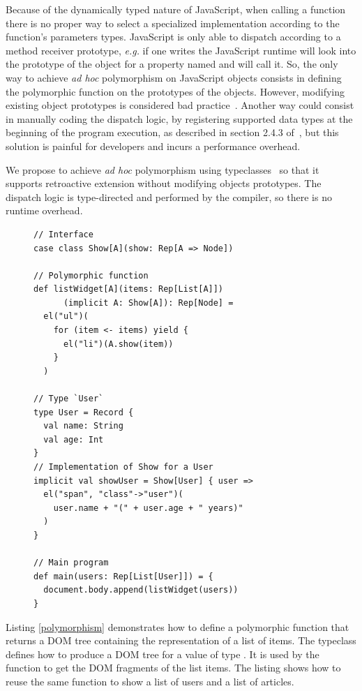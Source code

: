 \documentclass[preprint]{sigplanconf}
\newcommand{\eg}{\emph{e.g.}}
\begin{document}
Because of the dynamically typed nature of JavaScript, when calling a function there is no proper way to select a
specialized implementation according to the function’s parameters types. JavaScript is only able to dispatch
according to a method receiver prototype, \eg{} if one writes  the JavaScript runtime will look into
the prototype of the  object for a property named  and will call it. So, the only way to achieve
\emph{ad hoc} polymorphism on JavaScript objects consists in defining the polymorphic function on the prototypes of
the objects. However, modifying existing object prototypes is considered bad
practice~\cite{Zakas12_MaintainableJs}. Another way could consist in manually coding the dispatch logic, by
registering supported data types at the beginning of the program execution, as described in section 2.4.3
of~\cite{Abelson83_SICP}, but this solution is painful for developers and incurs a performance overhead.

We propose to achieve \emph{ad hoc} polymorphism using
typeclasses~\cite{Wadler89_AdhocPolymorphism,Odersky06_Typeclasses,Oliveira10_Typeclasses} so that it supports
retroactive extension without modifying objects prototypes. The dispatch logic is type-directed and performed by the
compiler, so there is no runtime overhead.

\begin{figure}
\begin{lstlisting}[label=polymorphism,caption=Ad hoc polymorphism using typeclasses]
// Interface
case class Show[A](show: Rep[A => Node])

// Polymorphic function
def listWidget[A](items: Rep[List[A]])
      (implicit A: Show[A]): Rep[Node] =
  el("ul")(
    for (item <- items) yield {
      el("li")(A.show(item))
    }
  )

// Type `User`
type User = Record {
  val name: String
  val age: Int
}
// Implementation of Show for a User
implicit val showUser = Show[User] { user =>
  el("span", "class"->"user")(
    user.name + "(" + user.age + " years)"
  )
}

// Main program
def main(users: Rep[List[User]]) = {
  document.body.append(listWidget(users))
}
\end{lstlisting}
\end{figure}

Listing \ref{polymorphism} demonstrates how to define a polymorphic  function that returns a DOM
tree containing the representation of a list of items. The  typeclass defines how to produce a DOM tree
for a value of type . It is used by the  function to get the DOM fragments of the list
items. The listing shows how to reuse the same  function to show a list of users and a list of
articles.
\end{document}
